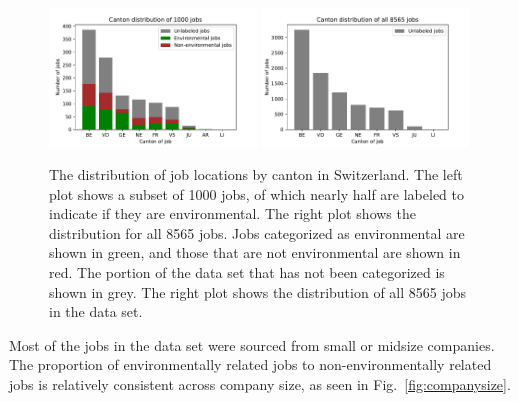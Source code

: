 \begin{figure}[htbp]
  \centering
    \includegraphics[width=0.49\textwidth]{figures/CantonDist.pdf}
    \includegraphics[width=0.49\textwidth]{figures/CantonDistAll.pdf}
    \caption[The distribution of job locations by canton in Switzerland]{
    	The distribution of job locations by canton in Switzerland.
        The left plot shows a subset of 1000 jobs, of which nearly half are labeled to indicate if they are environmental. The right plot shows the distribution for all 8565 jobs.
        Jobs categorized as environmental are shown in green, and those that are not environmental are shown in red.
        The portion of the data set that has not been categorized is shown in grey. The right plot shows the distribution
        of all 8565 jobs in the data set.
    }
\label{fig:cantons}
\end{figure}

Most of the jobs in the data set were sourced from small or midsize companies. The proportion of environmentally related jobs to non-environmentally related jobs is relatively consistent across company size, as seen in Fig.~\ref{fig:companysize}.


